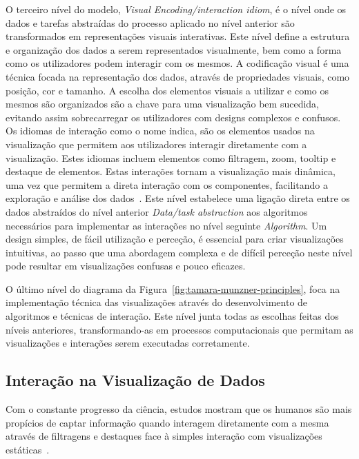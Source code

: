 O terceiro nível do modelo, \textit{Visual Encoding/interaction idiom}, é o nível onde os dados e tarefas abstraídas do processo aplicado no nível anterior são transformados em representações visuais interativas. Este nível define a estrutura e organização dos dados a serem representados visualmente, bem como a forma como os utilizadores podem interagir com os mesmos.
A codificação visual é uma técnica focada na representação dos dados, através de propriedades visuais, como posição, cor e tamanho. A escolha dos elementos visuais a utilizar e como os mesmos são organizados são a chave para uma visualização bem sucedida, evitando assim sobrecarregar os utilizadores com designs complexos e confusos.
Os idiomas de interação como o nome indica, são os elementos usados na visualização que permitem aos utilizadores interagir diretamente com a visualização. Estes idiomas incluem elementos como filtragem, zoom, tooltip e destaque de elementos. Estas interações tornam a visualização mais dinâmica, uma vez que permitem a direta interação com os componentes, facilitando a exploração e análise dos dados~\cite{figueiras2015towards}.
Este nível estabelece uma ligação direta entre os dados abstraídos do nível anterior \textit{Data/task abstraction} aos algoritmos necessários para implementar as interações no nível seguinte \textit{Algorithm}. Um design simples, de fácil utilização e perceção, é essencial para criar visualizações intuitivas, ao passo que uma abordagem complexa e de difícil perceção neste nível pode resultar em visualizações confusas e pouco eficazes.

O último nível do diagrama da Figura~\ref{fig:tamara-munzner-principles}, foca na implementação técnica das visualizações através do desenvolvimento de algoritmos e técnicas de interação. Este nível junta todas as escolhas feitas dos níveis anteriores, transformando-as em processos computacionais que permitam as visualizações e interações serem executadas corretamente.

\subsection{Interação na Visualização de Dados} %
\label{sub:elem_int}

Com o constante progresso da ciência, estudos mostram que os humanos são mais propícios de captar informação quando interagem diretamente com a mesma através de filtragens e destaques face à simples interação com visualizações estáticas~\cite{heer2012interactive}. 

